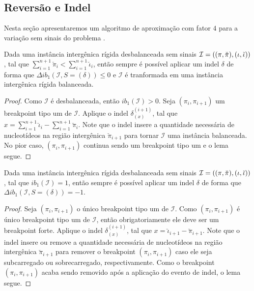 \subsection{Reversão e Indel}

Nesta seção apresentaremos um algoritmo de aproximação com fator $4$ para a variação sem sinais do problema \SbIRI{}.

\begin{lemma}\label{lemma:QGOIQLZD}
Dada uma instância intergênica rígida desbalanceada sem sinais $\mathcal{I}=((\pi,\breve\pi),\break(\iota,\breve\iota))$, tal que $\sum_{i=1}^{n+1}\breve\pi_i < \sum_{i=1}^{n+1}\breve\iota_i$, então sempre é possível aplicar um indel $\delta$ de forma que $\Delta ib_1(\mathcal{I}, S=(\delta)) \le 0$ e $\mathcal{I}$ é tranformada em uma instância intergênica rígida balanceada.
\end{lemma}
\begin{proof}
Como $\mathcal{I}$ é desbalanceada, então $ib_1(\mathcal{I}) > 0$. Seja $(\pi_i,\pi_{i+1})$ um breakpoint tipo um de $\mathcal{I}$. Aplique o indel $\delta_{(x)}^{(i+1)}$, tal que $x = \sum_{i=1}^{n+1}\breve\iota_i - \sum_{i=1}^{n+1}\breve\pi_i$. Note que o indel insere a quantidade necessária de nucleotídeos na região intergênica $\breve\pi_{i+1}$ para tornar $\mathcal{I}$ uma instância balanceada. No pior caso, $(\pi_i,\pi_{i+1})$ continua sendo um breakpoint tipo um e o lema segue.
\end{proof}

\begin{lemma}\label{lemma:QNHGBLYF}
Dada uma instância intergênica rígida desbalanceada sem sinais $\mathcal{I}=((\pi,\breve\pi),\break(\iota,\breve\iota))$, tal que $ib_1(\mathcal{I}) = 1$, então sempre é possível aplicar um indel $\delta$ de forma que $\Delta ib_1(\mathcal{I}, S=(\delta)) = -1$.
\end{lemma}
\begin{proof}
Seja $(\pi_i,\pi_{i+1})$ o único breakpoint tipo um de $\mathcal{I}$. Como $(\pi_i,\pi_{i+1})$ é único breakpoint tipo um de $\mathcal{I}$, então obrigatoriamente ele deve ser um breakpoint forte. Aplique o indel $\delta_{(x)}^{(i+1)}$, tal que $x = \breve\iota_{i+1} - \breve\pi_{i+1}$. Note que o indel insere ou remove a quantidade necessária de nucleotídeos na região intergênica $\breve\pi_{i+1}$ para remover o breakpoint $(\pi_i,\pi_{i+1})$ caso ele seja subcarregado ou sobrecarregado, respectivamente. Como o breakpoint $(\pi_i,\pi_{i+1})$ acaba sendo removido após a aplicação do evento de indel, o lema segue.
\end{proof}

